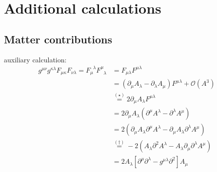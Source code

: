 \chapter{Additional calculations}\label{chap:AppB}
\blindtext

\section{Matter contributions}
auxiliary calculation:
\begin{align}\label{eqn:FF2} 
g^{\mu\nu}g^{\kappa\lambda} F_{\mu\kappa}F_{\nu\lambda} =  F_{\mu}^{\phantom{\mu}\lambda}F_{\phantom{\mu}\lambda}^{\mu}	&= F_{\mu\lambda}F^{\mu\lambda} \nonumber	\\
&= \left(\partial_{\mu}A_{\lambda} - \partial_{\lambda}A_{\mu}\right)F^{\mu\lambda} + \mathcal{O}\left(A^3\right)\nonumber \\
&\overset{(\star)}{=} 2\partial_{\mu}A_{\lambda} F^{\mu\lambda}\nonumber  \\
&=  2\partial_{\mu}A_{\lambda}\left(\partial^{\mu}A^{\lambda} - \partial^{\lambda}A^{\mu}\right) \\
&= 2\left(\partial_{\mu}A_{\lambda}\partial^{\mu}A^{\lambda} - \partial_{\mu}A_{\lambda}\partial^{\lambda}A^{\mu}\right) \nonumber\\
&\overset{(\dagger)}{=} -2\left( A_{\lambda}\partial^2A^{\lambda} - A_{\lambda}\partial_{\mu}\partial^{\lambda}A^{\mu}\right) \nonumber\\
&= 2A_{\lambda}\left[\partial^{\mu}\partial^{\lambda} - g^{\mu\lambda}\partial^2\right]A_{\mu}\nonumber 
\end{align}


